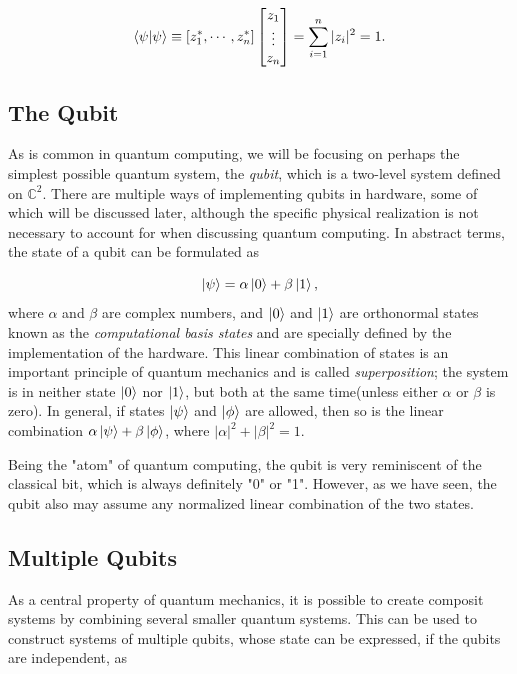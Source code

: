 \begin{equation}
    \braket{\psi}{\psi} \equiv [z_1^*, \cdots, z_n^*] 
    \begin{bmatrix}
        z_{1} \\
        \vdots \\
        z_{n}
    \end{bmatrix}
    = \sum_{i=1}^{n} |z_i|^2 = 1.
\end{equation}

\subsection{The Qubit}\label{sec:TheQubit}
As is common in quantum computing, we will be focusing on perhaps the simplest possible quantum system, the \emph{qubit}, which is a two-level system defined on $\mathbb{C}^2$.  There are multiple ways of implementing qubits in hardware, some of which will be discussed later, although  the specific physical realization is not necessary to account for when discussing quantum computing. In abstract terms, the state of a qubit can be formulated as

\begin{equation}
\ket{\psi} = \alpha \ket{0} + \beta \ket{1},
\end{equation}
where $\alpha$ and $\beta$ are complex numbers, and $\ket{0}$ and $\ket{1}$ are orthonormal states known as the \emph{computational basis states} and are specially defined by the implementation of the hardware. This linear combination of states is an important principle of quantum mechanics and is called \emph{superposition}; the system is in neither state $\ket{0}$ nor $\ket{1}$, but both at the same time(unless either $\alpha$ or $\beta$ is zero). In general, if states $\ket{\psi}$ and $\ket{\phi}$ are allowed, then so is the linear combination $\alpha \ket{\psi} + \beta \ket{\phi}$, where $|\alpha|^2 + |\beta|^2 = 1$.

Being the "atom" of quantum computing, the qubit is very reminiscent of the classical bit, which is always definitely "0" or "1". However, as we have seen, the qubit also may assume any normalized linear combination of the two states.
\subsection{Multiple Qubits}\label{sec:Multiple Qubits}
As a central property of quantum mechanics, it is possible to create composit systems by combining several smaller quantum systems. This can be used to construct systems of multiple qubits, whose state can be expressed, if the qubits are independent, as

